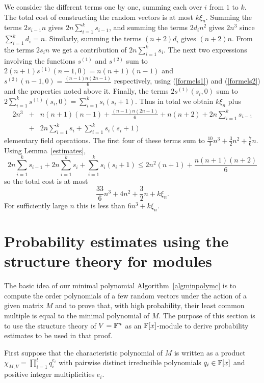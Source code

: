 We consider the different terms
one by one, summing each over $i$ from $1$ to $k$. 
The total cost of constructing the random vectors is at most $k\xi_{n}$.
Summing the terms $2 s_{i-1} n$ gives $2n\sum_{i=1}^{k} s_{i-1}$, and
summing the terms $2d_in^2$ gives $2n^3$ since $\sum_{i=1}^k d_i=n$. 
Similarly, summing the terms
$(n+2)d_i$ gives $(n+2)n$. From the terms $2s_in$ we
get a contribution of 
$2n \sum_{i=1}^{k} s_i$.
The next two expressions involving the functions $s^{(1)}$ and $s^{(2)}$
sum to $2(n+1)s^{(1)}(n-1,0) = n(n+1)(n-1)$ and $s^{(2)}(n-1,0) = 
\frac{(n-1)n(2n-1)}{6}$ respectively, using (\ref{formels1}) and
(\ref{formels2}) and the properties noted
above it. 
Finally, the terms $2s^{(1)}(s_i,0)$ sum to 
$2\sum_{i=1}^k s^{(1)}(s_i,0) 
= \sum_{i=1}^k s_i(s_i+1)$.
Thus in total we obtain $k\xi_n$ plus
\begin{eqnarray*}
 2n^3
   &+&n(n+1)(n-1)
   +\frac{(n-1)n(2n-1)}{6}
   +n(n+2)
   +2n\sum_{i=1}^k s_{i-1} \\
   &+&2n\sum_{i=1}^k s_i
   +\sum_{i=1}^k s_i(s_i+1) 
\end{eqnarray*}
elementary field operations. The first four of these terms sum to $\frac{10}{3}n^3
   +\frac{3}{2}n^2
   +\frac{7}{6}n$. 
Using Lemma~\ref{estimates},
\[ 
   2n\sum_{i=1}^k s_{i-1}
   +2n\sum_{i=1}^k s_i
   +\sum_{i=1}^k s_i(s_i+1)\leq 2n^2(n+1)+\frac{n(n+1)(n+2)}{6} \]
so the total cost is at most 
\[
\frac{33}{6}n^3+4n^2+\frac{3}{2}n +k\xi_n.
\]
For sufficiently large $n$ this is less than $6n^3+k\xi_n$.
\proofend


\section{Probability estimates using the structure theory for modules}
\label{probest}

The basic idea of our minimal polynomial Algorithm~\ref{algminpolymc}
is to compute the order polynomials of a few
random vectors under the action of a given matrix $M$ and to prove that, 
with high probability, their least common multiple is
equal to the minimal polynomial of $M$.
The purpose of this section is to use the structure theory 
of $V = \mathbb{F}^n$ as an $\mathbb{F}[x]$-module to derive probability
estimates to be used in that proof.

First suppose that the characteristic polynomial of $M$ is written as a product
$\chi_{M,V} = \prod_{i=1}^t q_i^{e_i}$ with pairwise distinct
irreducible polynomials $q_i \in \mathbb{F}[x]$ and positive integer
multiplicities $e_i$.

